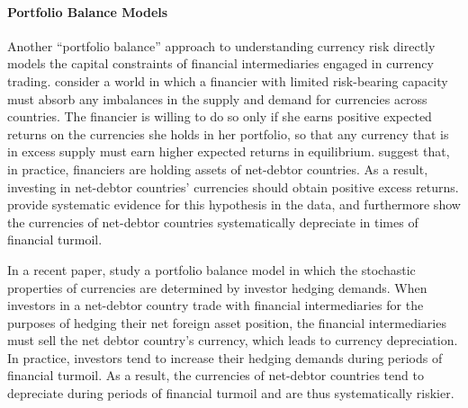 \documentclass{ar-1col}
\begin{document}
\paragraph*{Portfolio Balance Models} Another ``portfolio balance'' approach to understanding currency risk directly models the capital constraints of financial intermediaries engaged in currency trading. \citet{GabaixMaggiori2015} consider a world in which a financier with limited risk-bearing capacity must absorb any imbalances in the supply and demand for currencies across countries. The financier is willing to do so only if she earns positive expected returns on the currencies she holds in her portfolio, so that any currency that is in excess supply must earn higher expected returns in equilibrium.  \citet{GabaixMaggiori2015} suggest that, in practice, financiers are holding assets of net-debtor countries. As a result, investing in net-debtor countries' currencies should obtain positive excess returns. \citet{DellaCorteetal2016} provide systematic evidence for this hypothesis in the data, and furthermore show the currencies of net-debtor countries systematically depreciate in times of financial turmoil. 

In a recent paper, \citet{LiaoZhang2020} study a portfolio balance model in which the stochastic properties of currencies are determined by investor hedging demands. When investors in a net-debtor country trade with financial intermediaries for the purposes of hedging their net foreign asset position, the financial intermediaries must sell the net debtor country's currency, which leads to currency depreciation. In practice, investors tend to increase their hedging demands during periods of financial turmoil. As a result, the currencies of net-debtor countries tend to depreciate during periods of financial turmoil and are thus systematically riskier.
 
\end{document}
